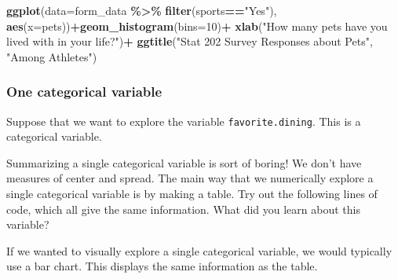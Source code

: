\documentclass[
]{article}
\newenvironment{Shaded}{\begin{snugshade}}{\end{snugshade}}
\newcommand{\AttributeTok}[1]{\textcolor[rgb]{0.13,0.29,0.53}{#1}}
\newcommand{\DecValTok}[1]{\textcolor[rgb]{0.00,0.00,0.81}{#1}}
\newcommand{\FunctionTok}[1]{\textcolor[rgb]{0.13,0.29,0.53}{\textbf{#1}}}
\newcommand{\NormalTok}[1]{#1}
\newcommand{\SpecialCharTok}[1]{\textcolor[rgb]{0.81,0.36,0.00}{\textbf{#1}}}
\newcommand{\StringTok}[1]{\textcolor[rgb]{0.31,0.60,0.02}{#1}}
\begin{document}
\begin{Shaded}
\begin{Highlighting}[]
\FunctionTok{ggplot}\NormalTok{(}\AttributeTok{data=}\NormalTok{form\_data }\SpecialCharTok{\%\textgreater{}\%} \FunctionTok{filter}\NormalTok{(sports}\SpecialCharTok{==}\StringTok{"Yes"}\NormalTok{), }\FunctionTok{aes}\NormalTok{(}\AttributeTok{x=}\NormalTok{pets))}\SpecialCharTok{+}\FunctionTok{geom\_histogram}\NormalTok{(}\AttributeTok{bins=}\DecValTok{10}\NormalTok{)}\SpecialCharTok{+}
  \FunctionTok{xlab}\NormalTok{(}\StringTok{"How many pets have you lived with in your life?"}\NormalTok{)}\SpecialCharTok{+}
  \FunctionTok{ggtitle}\NormalTok{(}\StringTok{"Stat 202 Survey Responses about Pets"}\NormalTok{, }\StringTok{"Among Athletes"}\NormalTok{)}
\end{Highlighting}
\end{Shaded}

\subsubsection{One categorical variable}\label{one-categorical-variable}

Suppose that we want to explore the variable \texttt{favorite.dining}.
This is a categorical variable.

Summarizing a single categorical variable is sort of boring! We don't
have measures of center and spread. The main way that we numerically
explore a single categorical variable is by making a table. Try out the
following lines of code, which all give the same information. What did
you learn about this variable?

\begin{Shaded}
\end{Shaded}

If we wanted to visually explore a single categorical variable, we would
typically use a bar chart. This displays the same information as the
table.
\end{document}
